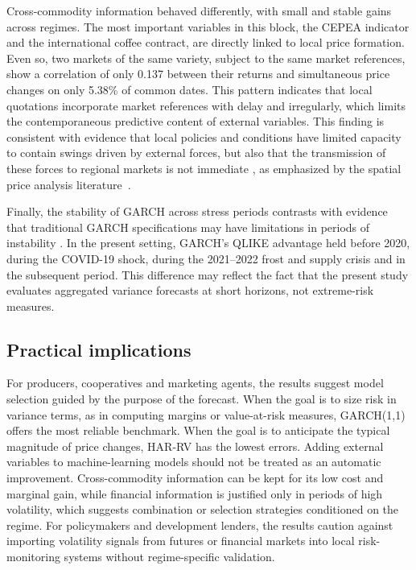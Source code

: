 \documentclass[a4paper,fleqn]{cas-sc}
\begin{document}
Cross-commodity information behaved differently, with small and stable gains across regimes. The most important variables in this block, the CEPEA indicator and the international coffee contract, are directly linked to local price formation. Even so, two markets of the same variety, subject to the same market references, show a correlation of only 0.137 between their returns and simultaneous price changes on only 5.38\% of common dates. This pattern indicates that local quotations incorporate market references with delay and irregularly, which limits the contemporaneous predictive content of external variables. This finding is consistent with evidence that local policies and conditions have limited capacity to contain swings driven by external forces, but also that the transmission of these forces to regional markets is not immediate \citep{Fahmi2023LocalCoffeePolicy,AliagaMiranda2026CoffeeShocks}, as emphasized by the spatial price analysis literature~\citep{FacklerGoodwin2001}.

Finally, the stability of GARCH across stress periods contrasts with evidence that traditional GARCH specifications may have limitations in periods of instability \citep{Brun2026GARCHCoffeeRisk}. In the present setting, GARCH's QLIKE advantage held before 2020, during the COVID-19 shock, during the 2021--2022 frost and supply crisis and in the subsequent period. This difference may reflect the fact that the present study evaluates aggregated variance forecasts at short horizons, not extreme-risk measures.

\subsection{Practical implications}
\label{subsec:disc_practical}

For producers, cooperatives and marketing agents, the results suggest model selection guided by the purpose of the forecast. When the goal is to size risk in variance terms, as in computing margins or value-at-risk measures, GARCH(1,1) offers the most reliable benchmark. When the goal is to anticipate the typical magnitude of price changes, HAR-RV has the lowest errors. Adding external variables to machine-learning models should not be treated as an automatic improvement. Cross-commodity information can be kept for its low cost and marginal gain, while financial information is justified only in periods of high volatility, which suggests combination or selection strategies conditioned on the regime. For policymakers and development lenders, the results caution against importing volatility signals from futures or financial markets into local risk-monitoring systems without regime-specific validation.
\end{document}
